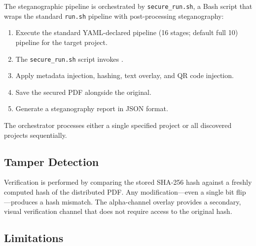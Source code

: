 \documentclass[
  english,
]{article}
\providecommand{\tightlist}{%
  \setlength{\itemsep}{0pt}\setlength{\parskip}{0pt}}
\begin{document}
The steganographic pipeline is orchestrated by \texttt{secure\_run.sh},
a Bash script that wraps the standard \texttt{run.sh} pipeline with
post-processing steganography:

\begin{enumerate}
\def\labelenumi{\arabic{enumi}.}
\tightlist
\item
  Execute the standard YAML-declared pipeline (16 stages; default full
  10) pipeline for the target project.
\item
  The \texttt{secure\_run.sh} script invokes
  .
\item
  Apply metadata injection, hashing, text overlay, and QR code
  injection.
\item
  Save the secured PDF alongside the original.
\item
  Generate a steganography report in JSON format.
\end{enumerate}

The orchestrator processes either a single specified project or all
discovered projects sequentially.

\subsection{Tamper Detection}\label{tamper-detection}

Verification is performed by comparing the stored SHA-256 hash against a
freshly computed hash of the distributed PDF. Any modification---even a
single bit flip---produces a hash mismatch. The alpha-channel overlay
provides a secondary, visual verification channel that does not require
access to the original hash.

\subsection{Limitations}\label{limitations-1}
\end{document}
